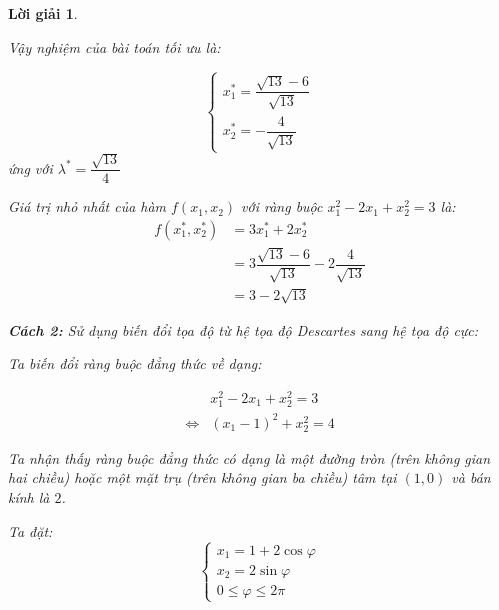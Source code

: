 \documentclass[14pt, a4paper]{article}
\theoremstyle{sltheorem}
\theoremstyle{soltheorem}
\newtheorem*{loigiai}{Lời giải}
\begin{document}
\begin{loigiai}
\begin{itemize}
            Vậy nghiệm của bài toán tối ưu là:

            \begin{equation*}
                \begin{cases} x_1^* = \dfrac{\sqrt{13}-6}{\sqrt{13}} \\ x_2^* = -\dfrac{4}{\sqrt{13}} \end{cases}
            \end{equation*}
            ứng với $\lambda^* = \dfrac{\sqrt{13}}{4}$

            Giá trị nhỏ nhất của hàm $f(x_1, x_2)$ với ràng buộc $x_1^2 - 2x_1 + x_2^2 =3$ là:
            \begin{equation*}
                \begin{aligned}
                f(x_1^*, x_2^*)&=3x_1^* + 2x_2^* \\&= 3 \dfrac{\sqrt{13}-6}{\sqrt{13}} - 2 \dfrac{4}{\sqrt{13}}\\
                &= 3 - 2\sqrt{13}
                \end{aligned}
            \end{equation*} 
        \end{itemize}

        \textbf{Cách 2:} Sử dụng biến đổi tọa độ từ hệ tọa độ Descartes sang hệ tọa độ cực:

        Ta biến đổi ràng buộc đẳng thức về dạng:

        \begin{equation*}
            \begin{aligned}
            &x_1^2 - 2x_1 + x_2^2 = 3 \\
            \Leftrightarrow & (x_1 - 1)^2 + x_2^2 = 4
            \end{aligned}
        \end{equation*}

        Ta nhận thấy ràng buộc đẳng thức có dạng là một đường tròn (trên không gian hai chiều) hoặc một mặt trụ (trên không gian ba chiều) tâm tại $(1, 0)$ và bán kính là $2$.

        Ta đặt:
        \begin{equation*}
            \begin{cases}
                x_1 = 1 + 2 \cos \varphi \\
                x_2 = 2 \sin \varphi \\
                0 \leq \varphi \leq 2 \pi
            \end{cases}
        \end{equation*}


\end{loigiai}
\end{document}

